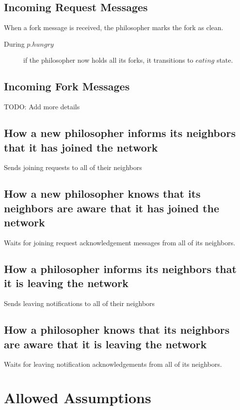\documentclass[11pt]{article}
\begin{document}
\subsection{Incoming Request Messages}
When a fork message is received, the philosopher marks the fork as clean.

\begin{description}
\item[During $p.hungry$] if the philosopher now holds all its forks, it transitions to $eating$ state.
\end{description}
\subsection{Incoming Fork Messages}
TODO: Add more details


\subsection{How a new philosopher informs its neighbors that it has joined the network}
Sends joining requests to all of their neighbors

\subsection{How a new philosopher knows that its neighbors are aware that it has joined the network}
Waits for joining request acknowledgement messages from all of its neighbors.
\subsection{How a philosopher informs its neighbors that it is leaving the network}
Sends leaving notifications to all of their neighbors

\subsection{How a philosopher knows that its neighbors are aware that it is leaving the network}
Waits for leaving notification acknowledgements from all of its neighbors.

\section{Allowed Assumptions}
\end{document}
